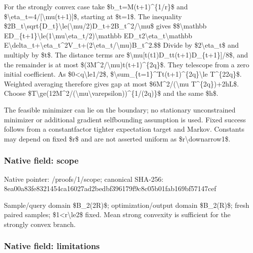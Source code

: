 \documentclass[10pt,a4paper]{article}
\begin{document}
For the strongly convex case take \$b\_t=M(t+1)\textasciicircum{}\{1/r\}\$ and \$\textbackslash{}eta\_t=4/[\textbackslash{}mu(t+1)]\$, starting at \$t=1\$. The inequality \$2B\_t\textbackslash{}sqrt\{D\_t\}\textbackslash{}le(\textbackslash{}mu/2\allowbreak{})D\_t+2B\_t\textasciicircum{}2/\textbackslash{}mu\$ gives
\$\$\textbackslash{}mathbb ED\_\{t+1\}\textbackslash{}le(1\textbackslash{}mu\textbackslash{}eta\_t/2)\textbackslash{}mathbb ED\_t2\textbackslash{}eta\_t\textbackslash{}mathbb E\textbackslash{}delta\_t+\textbackslash{}eta\_t\textasciicircum{}2V\_t+(2\allowbreak{}\textbackslash{}eta\_t/\textbackslash{}mu)B\_t\textasciicircum{}2.\$\$
Divide by \$2\textbackslash{}eta\_t\$ and multiply by \$t\$. The distance terms are \$\textbackslash{}mu[t(t1)D\_tt(t+1)D\_\{t+1\}]/8\$, and the remainder is at most \$(3M\textasciicircum{}2/\textbackslash{}mu)t(t+1)\textasciicircum{}\{2q\}\$. They telescope from a zero initial coefficient. As \$0<q\textbackslash{}le1/2\$, \$\textbackslash{}sum\_\{t=1\}\textasciicircum{}Tt(t+1)\textasciicircum{}\{2q\}\textbackslash{}le T\textasciicircum{}\{22q\}\$. Weighted averaging therefore gives gap at most \$6M\textasciicircum{}2/(\textbackslash{}mu T\textasciicircum{}\{2q\})+2hL\$. Choose \$T\textbackslash{}ge(12M\textasciicircum{}2/(\textbackslash{}mu\textbackslash{}varepsilon))\textasciicircum{}\{1/(2q)\}\$ and the same \$h\$.

The feasible minimizer can lie on the boundary; no stationary unconstrained minimizer or additional gradient selfbounding assumption is used. Fixed success follows from a constantfactor tighter expectation target and Markov. Constants may depend on fixed \$r\$ and are not asserted uniform as \$r\textbackslash{}downarrow1\$.


\subsubsection{Native field: scope}


Native pointer: /proofs/1/scope; canonical SHA-256: 8ea00a83fe8321454ca16027\allowbreak{}ad2bedbf396179f9c8c05b01\allowbreak{}fab169bf57147cef


Sample/query domain \$B\_2(2R)\$; optimization/output domain \$B\_2(R)\$; fresh paired samples; \$1<r\textbackslash{}le2\$ fixed. Mean strong convexity is sufficient for the strongly convex branch.


\subsubsection{Native field: limitations}
\end{document}
